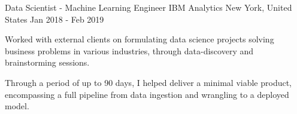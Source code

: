 \begin{cventries}
  \cventry
    {Data Scientist - Machine Learning Engineer} %
    {IBM Analytics} %
    {New York, United States} %
    {Jan 2018 - Feb 2019} %
    {
      \begin{cvitems} %
        \item {Worked with external clients on formulating data science projects solving business problems in various industries, through data-discovery and brainstorming sessions.}
        \item {Through a period of up to 90 days, I helped deliver a minimal viable product, encompassing a full pipeline from data ingestion and wrangling to a deployed model.}
      \end{cvitems}
    }

\end{cventries}
